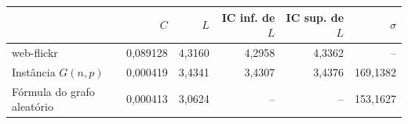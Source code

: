 \begin{tabular}{lrrrrr}
\toprule
 & $C$ & $L$ & IC inf. de $L$ & IC sup. de $L$ & $\sigma$ \\
\midrule
web-flickr & 0,089128 & 4,3160 & 4,2958 & 4,3362 & -- \\
Instância $G(n, p)$ & 0,000419 & 3,4341 & 3,4307 & 3,4376 & 169,1382 \\
Fórmula do grafo aleatório & 0,000413 & 3,0624 & -- & -- & 153,1627 \\
\bottomrule
\end{tabular}
